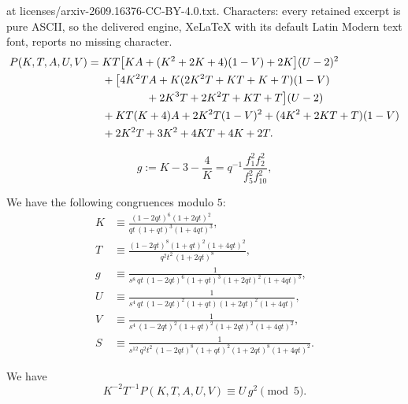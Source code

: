 \documentclass[10pt,a4paper]{amsart}
\begin{document}
at licenses/arxiv-2609.16376-CC-BY-4.0.txt. Characters: every retained excerpt is pure ASCII, so the delivered engine, XeLaTeX with its default Latin Modern text font, reports no missing character.
\begin{align}\label{eq.P2}
P(K,T,A,U,V)={}&KT\bigl[KA+(K^{2}+2K+4)(1-V)+2K\bigr](U-2)^{2}\\
\notag&+\bigl[4K^{2}TA+K(2K^{2}T+KT+K+T)(1-V)\\
\notag&\qquad\qquad{}+2K^{3}T+2K^{2}T+KT+T\bigr](U-2)\\
\notag&+KT(K+4)A+2K^{2}T(1-V)^{2}+(4K^{2}+2KT+T)(1-V)\\
\notag&+2K^{2}T+3K^{2}+4KT+4K+2T .
\end{align}

\begin{equation}\label{eq.g-def}
    g:=K-3-\frac4K =q^{-1}\dfrac{f_1^{2}f_2^{2}}{f_5^{2}f_{10}^{2}},
\end{equation}

\begin{lemma}\label{lem.param}
We have the following congruences modulo $5$:
\begin{align}
\label{eq.pK} K&\equiv\frac{(1-2qt)^{6}(1+2qt)^{2}}{qt\,(1+qt)^{3}(1+4qt)^{3}},\\
\label{eq.pT} T&\equiv\frac{(1-2qt)^{8}(1+qt)^{2}(1+4qt)^{2}}{q^{2}t^{2}\,(1+2qt)^{8}},\\
\label{eq.pg} g&\equiv\frac{1}{s^{8}\,qt\,(1-2qt)^{6}(1+qt)^{3}(1+2qt)^{2}(1+4qt)^{3}},\\
\label{eq.pU} U&\equiv\frac{1}{s^{4}\,qt\,(1-2qt)^{2}(1+qt)(1+2qt)^{2}(1+4qt)},\\
\label{eq.pV} V&\equiv\frac{1}{s^{4}\,(1-2qt)^{2}(1+qt)^{2}(1+2qt)^{2}(1+4qt)^{2}},\\
\label{eq.pS} S&\equiv\frac{1}{s^{12}\,q^{2}t^{2}\,(1-2qt)^{8}(1+qt)^{2}(1+2qt)^{8}(1+4qt)^{2}}.
\end{align}
\end{lemma}

\begin{lemma}\label{lem.collapse}
We have
\begin{equation}
K^{-2}T^{-1}P(K,T,A,U,V)\equiv U\, g^{2} \pmod 5.
\label{eq.collapse}
\end{equation}
\end{lemma}
\end{document}
